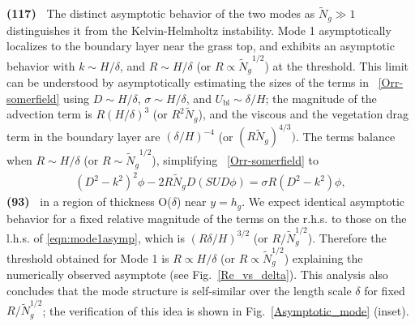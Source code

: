 \documentclass[aps,prl,reprint,twocolumn,superscriptaddress,sort&compress,10pt]{revtex4-1}  %
\newcommand{\hg}{h_g}
\newcommand{\Rey}{{R}}
\newcommand{\Ndg}{\tilde{N}_g}
\newcommand{\ubl}{U_\text{bl}}
\newcommand{\words}[1]{\textbf{(#1)~}}
\begin{document}
\words{117} The distinct asymptotic behavior of the two modes as $\Ndg \gg 1$ distinguishes it from the Kelvin-Helmholtz instability. 
Mode 1 asymptotically localizes to the boundary layer near the grass top, and exhibits an asymptotic behavior with $k \sim H/\delta$, and $\Rey \sim H/\delta$ (or $\Rey \propto {\Ndg}^{1/2}$) at the threshold. 
This limit can be understood by asymptotically estimating the sizes of the terms in ~\eqref{Orr-somerfield} using $D\sim H/\delta$, $\sigma \sim H/\delta$, and $\ubl \sim \delta/H$; the magnitude of the advection term is $\Rey (H/\delta)^3$  (or $\Rey^2 \Ndg$), and the viscous and the vegetation drag term in the boundary layer are $(\delta/H)^{-4}$ (or $(\Rey \Ndg)^{4/3})$. 
The terms balance when $\Rey \sim H/\delta$ (or $\Rey \sim {\Ndg}^{1/2}$), simplifying ~\eqref{Orr-somerfield} to
\begin{align}
(D^2-k^2)^2 \phi- 2 \Rey \Ndg D( SUD\phi) = \sigma \Rey (D^2-k^2)\phi,
\label{eqn:mode1asymp}
\end{align} 
\words{93} in a region of thickness O($\delta$) near $y=\hg$.
We expect identical asymptotic behavior for a fixed relative magnitude of the terms on the r.h.s. to those on the l.h.s. of \eqref{eqn:mode1asymp}, which is $(\Rey \delta/H)^{3/2}$ (or $\Rey/\Ndg^{1/2}$).
Therefore the threshold obtained for Mode 1 is $\Rey \propto H/\delta$ (or $\Rey \propto \Ndg^{1/2}$) explaining the numerically observed asymptote (see Fig.~\ref{Re_vs_delta}). 
This analysis also concludes that the mode structure is self-similar over the length scale $\delta$ for fixed $\Rey/\Ndg^{1/2}$; the verification of this idea is shown in Fig.~\ref{Asymptotic_mode} (inset).
\end{document}
